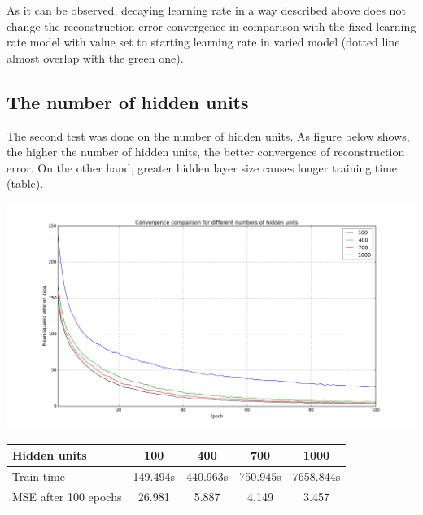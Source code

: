 \documentclass[a4paper]{scrartcl}
\begin{document}
As it can be observed, decaying learning rate in a way described above does not change the reconstruction error convergence in comparison with the fixed learning rate model with value set to starting learning rate in varied model (dotted line almost overlap with the green one).
\subsection{The number of hidden units}
\par The second test was done on the number of hidden units. As figure below shows, the higher the number of hidden units, the better convergence of reconstruction error. On the other hand, greater hidden layer size causes longer training time (table).
\begin{center}
\includegraphics[width=14cm]{images/hu.png}
\end{center}

\hspace{1cm}
\begin{tabular}{ | l || c | c | c | c | } 
	\hline
	Hidden units & 100 & 400 & 700 & 1000 \\ \hline
	Train time & 149.494s & 440.963s & 750.945s & 7658.844s \\ \hline
	MSE after 100 epochs & 26.981 & 5.887 & 4.149 & 3.457\\ 
	\hline 
\end{tabular}
\end{document}
